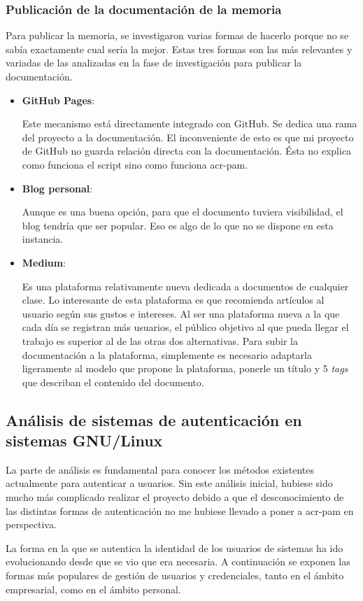 \documentclass[twoside, titlepage, 12pt, a4paper]{article}
\begin{document}
\subsubsection{Publicación de la documentación de la memoria}
Para publicar la memoria, se investigaron varias formas de hacerlo porque no se sabía exactamente cual sería la mejor. Estas tres formas son las más relevantes y variadas de las analizadas en la fase de investigación para publicar la documentación.
\begin{itemize}
	\item{\textbf{GitHub Pages}:}\par
		Este mecanismo está directamente integrado con \gls{GitHub}. Se dedica una rama del proyecto a la documentación. El inconveniente de esto es que mi proyecto de \gls{GitHub} no guarda relación directa con la documentación. Ésta no explica como funciona el \gls{script} sino como funciona \gls{acr-pam}.
	\item{\textbf{Blog personal}:}\par
		Aunque es una buena opción, para que el documento tuviera visibilidad, el blog tendría que ser popular. Eso es algo de lo que no se dispone en esta instancia.
	\item{\textbf{Medium}:}\par
		Es una plataforma relativamente nueva dedicada a documentos de cualquier clase. Lo interesante de esta plataforma es que recomienda artículos al usuario según sus gustos e intereses. Al ser una plataforma nueva a la que cada día se registran más usuarios, el público objetivo al que pueda llegar el trabajo es superior al de las otras dos alternativas. Para subir la documentación a la plataforma, simplemente es necesario adaptarla ligeramente al modelo que propone la plataforma, ponerle un título y 5 \textit{tags} que describan el contenido del documento.
\end{itemize}
\subsection{Análisis de sistemas de autenticación en sistemas \gls{GNU/Linux}}
La parte de análisis es fundamental para conocer los métodos existentes actualmente para autenticar a usuarios. Sin este análisis inicial, hubiese sido mucho más complicado realizar el proyecto debido a que el desconocimiento de las distintas formas de autenticación no me hubiese llevado a poner a \gls{acr-pam} en perspectiva. \par
La forma en la que se autentica la identidad de los usuarios de sistemas ha ido evolucionando desde que se vio que era necesaria. A continuación se exponen las formas más populares de gestión de usuarios y credenciales, tanto en el ámbito empresarial, como en el ámbito personal.
\end{document}

